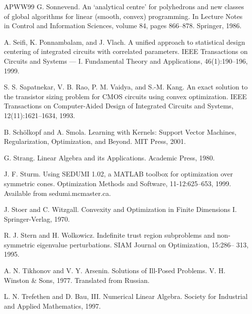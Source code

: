 \begin{thebibliography}{APWW99}
 G. Sonnevend. An ‘analytical centre’ for polyhedrons and new classes of global algorithms for linear (smooth, convex) programming. In Lecture Notes in Control and Information Sciences, volume 84, pages 866–878. Springer, 1986.

 A. Seifi, K. Ponnambalam, and J. Vlach. A unified approach to statistical design centering of integrated circuits with correlated parameters. IEEE Transactions on Circuits and Systems — I. Fundamental Theory and Applications, 46(1):190–196, 1999.

 S. S. Sapatnekar, V. B. Rao, P. M. Vaidya, and S.-M. Kang. An exact solution to the transistor sizing problem for CMOS circuits using convex optimization. IEEE Transactions on Computer-Aided Design of Integrated Circuits and Systems, 12(11):1621–1634, 1993.

 B. Schölkopf and A. Smola. Learning with Kernels: Support Vector Machines, Regularization, Optimization, and Beyond. MIT Press, 2001.

 G. Strang. Linear Algebra and its Applications. Academic Press, 1980.

 J. F. Sturm. Using SEDUMI 1.02, a MATLAB toolbox for optimization over symmetric cones. Optimization Methods and Software, 11-12:625–653, 1999. Available from sedumi.mcmaster.ca.

 J. Stoer and C. Witzgall. Convexity and Optimization in Finite Dimensions I. Springer-Verlag, 1970.

 R. J. Stern and H. Wolkowicz. Indefinite trust region subproblems and non-symmetric eigenvalue perturbations. SIAM Journal on Optimization, 15:286– 313, 1995.

 A. N. Tikhonov and V. Y. Arsenin. Solutions of Ill-Posed Problems. V. H. Winston \& Sons, 1977. Translated from Russian.

 L. N. Trefethen and D. Bau, III. Numerical Linear Algebra. Society for Industrial and Applied Mathematics, 1997.


\end{thebibliography}
